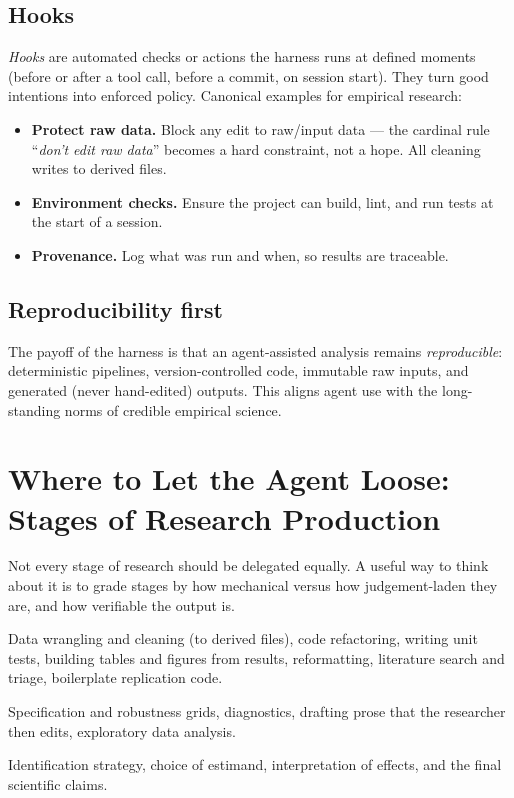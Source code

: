 \documentclass[11pt]{article}
\begin{document}
\subsection{Hooks}
\emph{Hooks} are automated checks or actions the harness runs at defined moments
(before or after a tool call, before a commit, on session start). They turn good
intentions into enforced policy. Canonical examples for empirical research:
\begin{itemize}[leftmargin=1.4em]
  \item \textbf{Protect raw data.} Block any edit to raw/input data --- the
  cardinal rule ``\emph{don't edit raw data}'' becomes a hard constraint, not a
  hope. All cleaning writes to derived files.
  \item \textbf{Environment checks.} Ensure the project can build, lint, and run
  tests at the start of a session.
  \item \textbf{Provenance.} Log what was run and when, so results are traceable.
\end{itemize}

\subsection{Reproducibility first}
The payoff of the harness is that an agent-assisted analysis remains
\emph{reproducible}: deterministic pipelines, version-controlled code, immutable
raw inputs, and generated (never hand-edited) outputs. This aligns agent use
with the long-standing norms of credible empirical science.

\section{Where to Let the Agent Loose: Stages of Research Production}

Not every stage of research should be delegated equally. A useful way to think
about it is to grade stages by how mechanical versus how judgement-laden they
are, and how verifiable the output is.

\begin{description}[leftmargin=1.4em, style=nextline]
  \item[High suitability] Data wrangling and cleaning (to derived files), code
  refactoring, writing unit tests, building tables and figures from results,
  reformatting, literature search and triage, boilerplate replication code.
  \item[Shared / supervised] Specification and robustness grids, diagnostics,
  drafting prose that the researcher then edits, exploratory data analysis.
  \item[Low suitability (human-owned)] Identification strategy, choice of
  estimand, interpretation of effects, and the final scientific claims.
\end{description}
\end{document}
